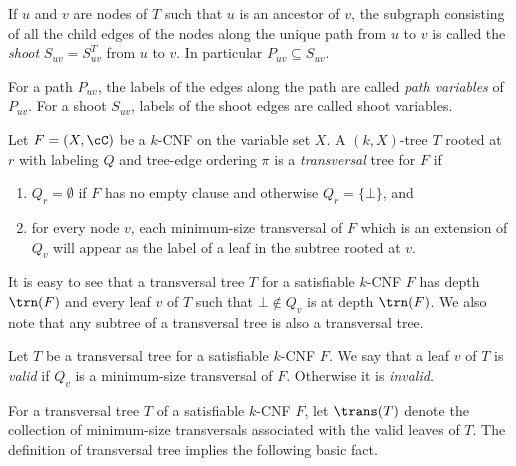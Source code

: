 

\begin{definition}
If $u$ and $v$ are nodes of $T$ such that $u$ is an ancestor of $v$, the subgraph consisting of all the child edges of the nodes 
along the unique path from $u$ to $v$ is called the \emph{shoot} $S_{uv} = S^T_{uv}$ from $u$ to $v$. In particular $P_{uv} \subseteq S_{uv}$.
\end{definition}

For a path $P_{uv}$, the labels of the  edges along the path are called \emph{path variables} of $P_{uv}$.
For a shoot $S_{uv}$, labels of the shoot edges are called shoot variables.

\begin{definition}
Let $F=(X,\cC)$ be a $k$-CNF on the variable set $X$.
A $(k,X)$-tree $T$ rooted at $r$ with labeling $Q$ and tree-edge ordering $\pi$
is a \emph{transversal} tree for $F$ if
\begin{enumerate}
\item $Q_r = \emptyset$ if $F$ has no empty clause 
and otherwise $Q_r = \{\bot\}$, and 
\item for every node $v$, each 
minimum-size transversal of $F$ which is an 
extension of $Q_v$ will appear as 
the label of a leaf in the subtree rooted at $v$.
\end{enumerate}
\end{definition}

It is easy to see that  a transversal tree $T$ for a satisfiable
$k$-CNF $F$ has depth $\trn(F)$ and 
every leaf $v$ of $T$ such that $\bot \notin Q_v$ is at depth $\trn(F)$.
We also note that any subtree of a transversal tree is also a transversal tree.

\begin{definition}
Let $T$ be a transversal tree for a satisfiable $k$-CNF $F$.
We say that a  leaf $v$ of $T$
is \emph{valid} if $Q_v$ is a minimum-size transversal of $F$.
Otherwise it is \emph{invalid}.
\end{definition}

For a transversal tree $T$ of a satisfiable $k$-CNF $F$, 
let $\trans(T)$ denote the 
collection  of minimum-size transversals associated 
with the valid leaves of $T$. The definition of transversal tree implies the following basic fact.

